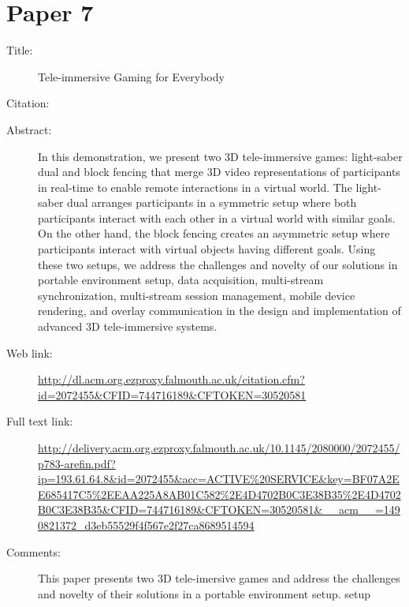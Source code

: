 \documentclass{scrartcl}
\begin{document}
\section*{Paper 7}
\begin{description}
\item[Title:] Tele-immersive Gaming for Everybody
\item[Citation:] \cite{Arefin:2011:TGE:2072298.2072455}
\item[Abstract:] In this demonstration, we present two 3D tele-immersive games:
light-saber dual and block fencing that merge 3D video representations
of participants in real-time to enable remote interactions in a
virtual world. The light-saber dual arranges participants in a symmetric
setup where both participants interact with each other in a
virtual world with similar goals. On the other hand, the block fencing
creates an asymmetric setup where participants interact with
virtual objects having different goals. Using these two setups, we
address the challenges and novelty of our solutions in portable environment
setup, data acquisition, multi-stream synchronization,
multi-stream session management, mobile device rendering, and
overlay communication in the design and implementation of advanced
3D tele-immersive systems.
\item[Web link:] \url{http://dl.acm.org.ezproxy.falmouth.ac.uk/citation.cfm?id=2072455&CFID=744716189&CFTOKEN=30520581}
\item[Full text link:] \url{http://delivery.acm.org.ezproxy.falmouth.ac.uk/10.1145/2080000/2072455/p783-arefin.pdf?ip=193.61.64.8&id=2072455&acc=ACTIVE%20SERVICE&key=BF07A2EE685417C5%2EEAA225A8AB01C582%2E4D4702B0C3E38B35%2E4D4702B0C3E38B35&CFID=744716189&CFTOKEN=30520581&__acm__=1490821372_d3eb55529f4f567e2f27ca8689514594}
\item[Comments:] This paper presents two 3D tele-imersive games and address the challenges and novelty of their solutions in a portable environment setup. 
setup
\end{description}
\end{document}
